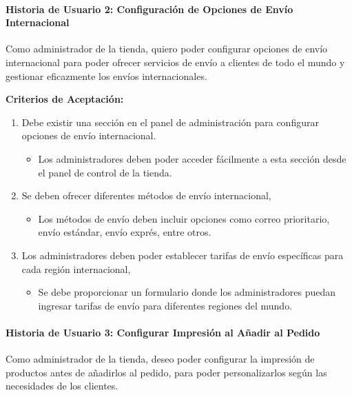 \documentclass[12pt]{article}
\newcommand{\subsubsubsection}[1]{\paragraph{#1}}
\begin{document}
\subsubsubsection{Historia de Usuario 2: Configuración de Opciones de Envío Internacional}\label{sec:historia2}

Como administrador de la tienda,
quiero poder configurar opciones de envío internacional
para poder ofrecer servicios de envío a clientes de todo el mundo y gestionar eficazmente los envíos internacionales.

\vspace{0.5cm}
\textbf{Criterios de Aceptación:}
\begin{enumerate}[label=\arabic*.]
    \item Debe existir una sección en el panel de administración para configurar opciones de envío internacional.
          \begin{itemize}[label=--]
              \item Los administradores deben poder acceder fácilmente a esta sección desde el panel de control de la tienda.
          \end{itemize}
    \item Se deben ofrecer diferentes métodos de envío internacional,
          \begin{itemize}[label=--]
              \item Los métodos de envío deben incluir opciones como correo prioritario, envío estándar, envío exprés, entre otros.
          \end{itemize}
    \item Los administradores deben poder establecer tarifas de envío específicas para cada región internacional,
          \begin{itemize}[label=--]
              \item Se debe proporcionar un formulario donde los administradores puedan ingresar tarifas de envío para diferentes regiones del mundo.
          \end{itemize}
\end{enumerate}


\subsubsubsection{Historia de Usuario 3: Configurar Impresión al Añadir al Pedido}\label{sec:historia3}

Como administrador de la tienda, deseo poder configurar la impresión de productos antes de añadirlos al pedido, para poder personalizarlos según las necesidades de los clientes.
\end{document}
